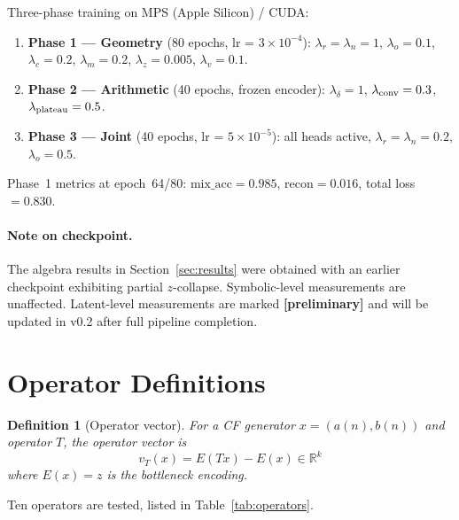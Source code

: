 \documentclass[11pt,a4paper]{article}
\newtheorem{definition}{Definition}
\begin{document}
Three-phase training on MPS (Apple Silicon) / CUDA:
\begin{enumerate}[noitemsep]
  \item \textbf{Phase 1 — Geometry} (80 epochs, lr = $3\times10^{-4}$):
        $\lambda_r = \lambda_n = 1$, $\lambda_o = 0.1$,
        $\lambda_c = 0.2$, $\lambda_m = 0.2$,
        $\lambda_z = 0.005$, $\lambda_v = 0.1$.
  \item \textbf{Phase 2 — Arithmetic} (40 epochs, frozen encoder):
        $\lambda_\delta = 1$, $\lambda_{\rm conv} = 0.3$,
        $\lambda_{\rm plateau} = 0.5$.
  \item \textbf{Phase 3 — Joint} (40 epochs, lr = $5\times10^{-5}$):
        all heads active, $\lambda_r = \lambda_n = 0.2$, $\lambda_o = 0.5$.
\end{enumerate}

Phase~1 metrics at epoch~64/80: $\text{mix\_acc} = 0.985$,
$\text{recon} = 0.016$, total loss $= 0.830$.

\paragraph{Note on checkpoint.}
The algebra results in Section~\ref{sec:results} were obtained with an
earlier checkpoint exhibiting partial $z$-collapse.  Symbolic-level
measurements are unaffected.  Latent-level measurements are marked
\textbf{[preliminary]} and will be updated in v0.2 after full pipeline
completion.

\section{Operator Definitions}
\label{sec:operators}

\begin{definition}[Operator vector]
  For a CF generator $x = (a(n), b(n))$ and operator $T$, the
  \emph{operator vector} is
  \[
    v_T(x) = E(Tx) - E(x) \in \mathbb{R}^k
  \]
  where $E(x) = z$ is the bottleneck encoding.
\end{definition}

Ten operators are tested, listed in Table~\ref{tab:operators}.
\end{document}
